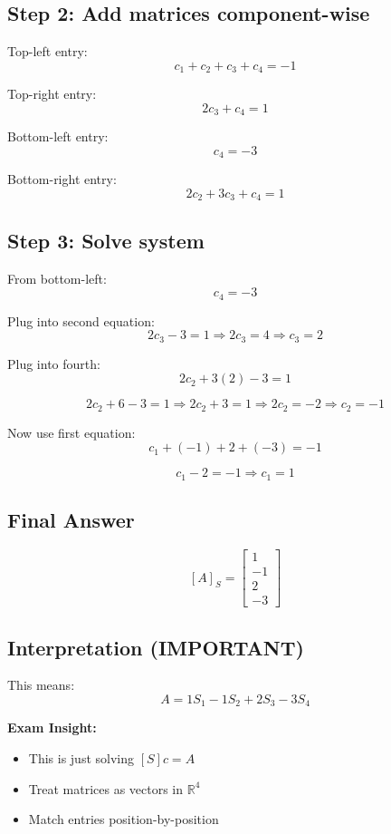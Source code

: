 \documentclass[11pt]{article}
\begin{document}
\subsection*{Step 2: Add matrices component-wise}

Top-left entry:
\[
c_1 + c_2 + c_3 + c_4 = -1
\]

Top-right entry:
\[
2c_3 + c_4 = 1
\]

Bottom-left entry:
\[
c_4 = -3
\]

Bottom-right entry:
\[
2c_2 + 3c_3 + c_4 = 1
\]

\subsection*{Step 3: Solve system}

From bottom-left:
\[
c_4 = -3
\]

Plug into second equation:
\[
2c_3 - 3 = 1 \Rightarrow 2c_3 = 4 \Rightarrow c_3 = 2
\]

Plug into fourth:
\[
2c_2 + 3(2) - 3 = 1
\]

\[
2c_2 + 6 - 3 = 1
\Rightarrow 2c_2 + 3 = 1
\Rightarrow 2c_2 = -2
\Rightarrow c_2 = -1
\]

Now use first equation:
\[
c_1 + (-1) + 2 + (-3) = -1
\]

\[
c_1 -2 = -1
\Rightarrow c_1 = 1
\]

\subsection*{Final Answer}

\[
[A]_S =
\begin{bmatrix}
1 \\ -1 \\ 2 \\ -3
\end{bmatrix}
\]

\subsection*{Interpretation (IMPORTANT)}

This means:
\[
A = 1S_1 - 1S_2 + 2S_3 - 3S_4
\]

\textbf{Exam Insight:}
\begin{itemize}
    \item This is just solving $[S]c = A$
    \item Treat matrices as vectors in $\mathbb{R}^4$
    \item Match entries position-by-position
\end{itemize}
\end{document}
